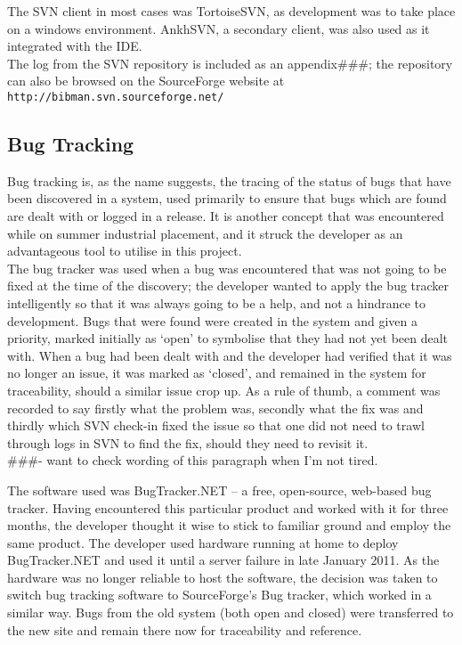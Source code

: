 \documentclass{l4proj}
\newcommand{\revisit}{\#\#\#}
\begin{document}
The SVN client in most cases was TortoiseSVN, as development was to take place on a windows environment.  AnkhSVN, a secondary client, was also used as it integrated with the IDE. \\
The log from the SVN repository is included as an appendix\revisit; the repository can also be browsed on the SourceForge website at \texttt{http://bibman.svn.sourceforge.net/}

\subsection{Bug Tracking}
\label{bugTracking}
Bug tracking is, as the name suggests, the tracing of the status of bugs that have been discovered in a system, used primarily to ensure that bugs which are found are dealt with or logged in a release.  It is another concept that was encountered while on summer industrial placement, and it struck the developer as an advantageous tool to utilise in this project.\\

The bug tracker was used when a bug was encountered that was not going to be fixed at the time of the discovery; the developer wanted to apply the bug tracker intelligently so that it was always going to be a help, and not a hindrance to development.  Bugs that were found were created in the system and given a priority, marked initially as `open' to symbolise that they had not yet been dealt with.  When a bug had been dealt with and the developer had verified that it was no longer an issue, it was marked as `closed', and remained in the system for traceability, should a similar issue crop up.  As a rule of thumb, a comment was recorded to say firstly what the problem was, secondly what the fix was and thirdly which SVN check-in fixed the issue so that one did not need to trawl through logs in SVN to find the fix, should they need to revisit it.\\ \revisit - want to check wording of this paragraph when I'm not tired.

The software used was BugTracker.NET -- a free, open-source, web-based bug tracker.  Having encountered this particular product and worked with it for three months, the developer thought it wise to stick to familiar ground and employ the same product.  The developer used hardware running at home to deploy BugTracker.NET and used it until a server failure in late January 2011.  As the hardware was no longer reliable to host the software, the decision was taken to switch bug tracking software to SourceForge's Bug tracker, which worked in a similar way.  Bugs from the old system (both open and closed) were transferred to the new site and remain there now for traceability and reference. \\
\end{document}

